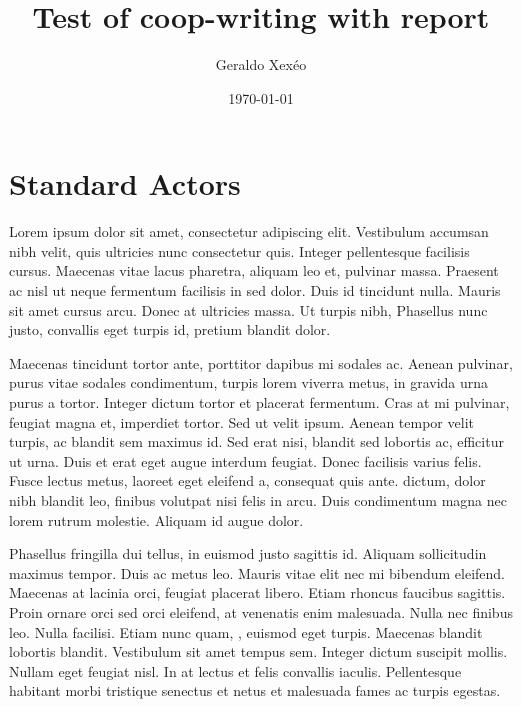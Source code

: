 \documentclass[12pt,a4paper]{article}
\author{Geraldo Xexéo}
\date{\today}
\title{Test of coop-writing with report}
\begin{document}
\maketitle

\section{Standard Actors}

Lorem ipsum dolor sit amet, consectetur adipiscing elit. Vestibulum accumsan nibh velit, quis ultricies nunc consectetur quis. Integer pellentesque facilisis cursus. Maecenas vitae lacus pharetra, aliquam leo et, pulvinar massa. Praesent ac nisl ut neque fermentum facilisis in sed dolor. Duis id tincidunt nulla. Mauris sit amet cursus arcu. Donec at ultricies massa. Ut turpis nibh,  Phasellus nunc justo, convallis eget turpis id, pretium blandit dolor.

\linenumbers
Maecenas tincidunt tortor ante, porttitor dapibus mi sodales ac. Aenean pulvinar, purus vitae sodales condimentum, turpis lorem viverra metus, in gravida urna purus a tortor. Integer dictum tortor et placerat fermentum. Cras at mi pulvinar, feugiat magna et, imperdiet tortor. Sed ut velit ipsum. Aenean tempor velit turpis, ac blandit sem maximus id. Sed erat nisi, blandit sed lobortis ac, efficitur ut urna. Duis et erat eget augue interdum feugiat. Donec facilisis varius felis. Fusce lectus metus, laoreet eget eleifend a, consequat quis ante.  dictum, dolor nibh blandit leo, finibus volutpat nisi felis in arcu. Duis condimentum magna nec lorem rutrum molestie. Aliquam id augue dolor.

\modulolinenumbers[2]
Phasellus fringilla dui tellus, in euismod justo sagittis id. Aliquam sollicitudin maximus tempor. Duis ac metus leo. Mauris vitae elit nec mi bibendum eleifend. Maecenas at lacinia orci, feugiat placerat libero. Etiam rhoncus faucibus sagittis. Proin ornare orci sed orci eleifend, at venenatis enim malesuada. Nulla nec finibus leo. Nulla facilisi. Etiam nunc quam, , euismod eget turpis. Maecenas blandit lobortis blandit. Vestibulum sit amet tempus sem. Integer dictum suscipit mollis. Nullam eget feugiat nisl. In at lectus et felis convallis iaculis. Pellentesque habitant morbi tristique senectus et netus et malesuada fames ac turpis egestas.
\end{document}
